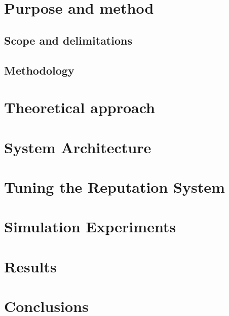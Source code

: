 \documentclass[a4paper,11pt]{kth-mag}
\begin{document}
\section{Purpose and method}

\subsection{Scope and delimitations}

\subsection{Methodology}


\section{Theoretical approach}

\section{System Architecture}

\section{Tuning the Reputation System}

\section{Simulation Experiments}

\section{Results}

\section{Conclusions}

\
\begin{comment}
\begin{figure}[ht]
\begin{center}
And here is a figure
\caption{\small{Several statements describing the same resource.}}\label{RDF_4}
\end{center}
\end{figure}


that we refer to here: \ref{RDF_4}
\end{comment}
\printbibliography
\end{document}
